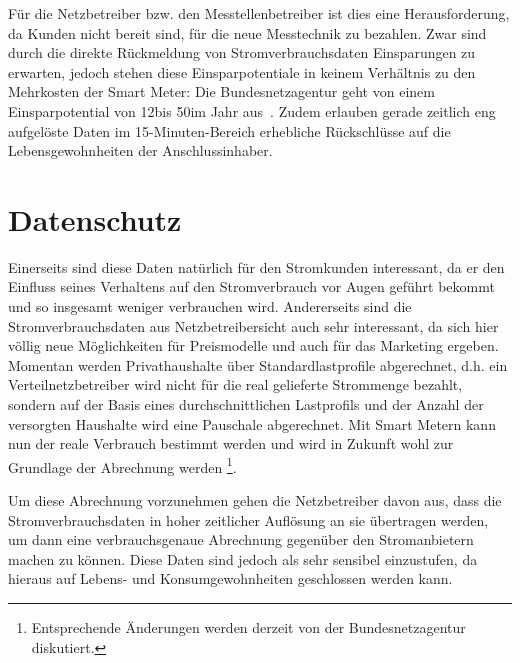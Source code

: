 \documentclass[12pt,BCOR=8.5mm]{scrartcl}
\newcommand*\euro{\textup{\EUR}}
\begin{document}
Für die Netzbetreiber bzw. den Messtellenbetreiber ist dies eine
Herausforderung, da Kunden nicht bereit sind, für die neue Messtechnik
zu bezahlen. Zwar sind durch die direkte Rückmeldung von
Stromverbrauchsdaten Einsparungen zu erwarten,
jedoch stehen diese Einsparpotentiale in keinem Verhältnis zu
den Mehrkosten der Smart Meter: Die Bundesnetzagentur geht von einem
Einsparpotential von 12\euro bis 50\euro im Jahr
aus~\cite[S. 70]{bundesnetzagentur10handlungsoptionen}. Zudem erlauben gerade zeitlich eng
aufgelöste Daten im 15-Minuten-Bereich erhebliche Rückschlüsse auf die
Lebensgewohnheiten der Anschlussinhaber.


\section{Datenschutz}\label{sub:datenschutz}
Einerseits sind diese Daten natürlich für den Stromkunden interessant,
da er den Einfluss seines Verhaltens auf den Stromverbrauch vor Augen
geführt bekommt und so insgesamt weniger verbrauchen wird.  
Andererseits sind die Stromverbrauchsdaten aus Netzbetreibersicht auch
sehr interessant, da sich hier völlig neue Möglichkeiten für
Preismodelle und auch für das Marketing ergeben. Momentan werden
Privathaushalte über Standardlastprofile abgerechnet, d.h. ein
Verteilnetzbetreiber wird nicht für die real gelieferte Strommenge
bezahlt, sondern auf der Basis eines durchschnittlichen Lastprofils und
der Anzahl der versorgten Haushalte wird eine Pauschale abgerechnet. Mit
Smart Metern kann nun der reale Verbrauch bestimmt werden und wird in
Zukunft wohl zur Grundlage der Abrechnung werden \footnote{Entsprechende
Änderungen werden derzeit von der Bundesnetzagentur diskutiert.}. 

Um diese Abrechnung vorzunehmen gehen die Netzbetreiber davon aus, dass
die Stromverbrauchsdaten in hoher zeitlicher Auflösung an sie übertragen
werden, um dann eine verbrauchsgenaue Abrechnung gegenüber den
Stromanbietern machen zu können. Diese Daten sind jedoch als sehr
sensibel einzustufen, da hieraus auf Lebens- und Konsumgewohnheiten
geschlossen werden kann. 
\end{document}
